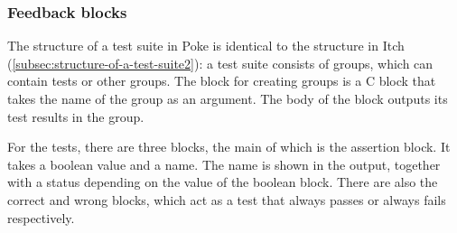 \documentclass[../main]{subfiles}
\begin{document}
\subsubsection{Feedback blocks}

\begin{scratch}[scale=0.6]
\end{scratch}

The structure of a test suite in Poke is identical to the structure in Itch (\cref{subsec:structure-of-a-test-suite2}): a test suite consists of groups, which can contain tests or other groups.
The block for creating groups is a C block that takes the name of the group as an argument.
The body of the block outputs its test results in the group.

\begin{wide}
    \begin{varwidth}{0.40\linewidth}
        \begin{scratch}[scale=0.6]
        \end{scratch}
    \end{varwidth}%
    \hspace{1em}%
    \begin{varwidth}{0.28\linewidth}
        \begin{scratch}[scale=0.6]
        \end{scratch}
    \end{varwidth}%
    \hspace{1em}%
    \begin{varwidth}{0.25\linewidth}
        \begin{scratch}[scale=0.6]
        \end{scratch}
    \end{varwidth}
\end{wide}

For the tests, there are three blocks, the main of which is the assertion block.
It takes a boolean value and a name.
The name is shown in the output, together with a status depending on the value of the boolean block.
There are also the correct and wrong blocks, which act as a test that always passes or always fails respectively.

\begin{scratch}[scale=0.6,else word={}]
\end{scratch}
\end{document}

